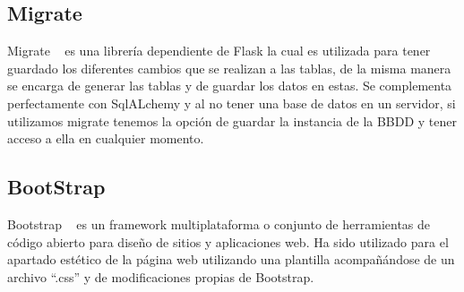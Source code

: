 \subsection{Migrate}
Migrate ~\cite{Flask:Migrate} es una librería dependiente de Flask la cual es utilizada para tener guardado los diferentes cambios que se realizan a las tablas, de la misma manera se encarga de generar las tablas y de guardar los datos en estas.
Se complementa perfectamente con SqlALchemy y al no tener una base de datos en un servidor, si utilizamos migrate tenemos la opción de guardar la instancia de la BBDD y tener acceso a ella en cualquier momento.
\subsection{BootStrap}
Bootstrap ~\cite{wiki:Bootstrap} es un framework multiplataforma o conjunto de herramientas de código abierto para diseño de sitios y aplicaciones web.
Ha sido utilizado para el apartado estético de la página web utilizando una plantilla acompañándose de un archivo “.css” y de modificaciones propias de Bootstrap.




